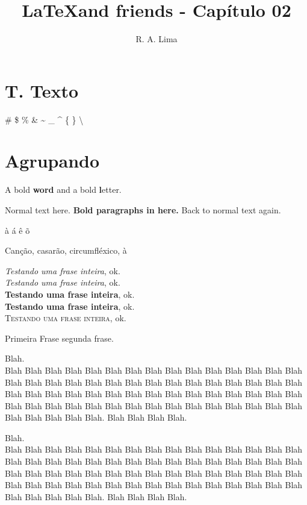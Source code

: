 \documentclass[a4paper, 12pt]{report}
\title{\LaTeX and friends - Capítulo 02}
\author{R. A. Lima}
\begin{document}
	\maketitle
	\section{T. Texto}
	\# \$ \% \& \textasciitilde
	\_ \textasciicircum 
	\{ \}
	\textbackslash

	\section{Agrupando}
	A bold \textbf{word} and a bold \textbf letter.

	Normal text here. {%
	\bfseries %
	Bold paragraphs in here.
	} %
	Back to  normal text again.

	\`{a} \'{a} \^{e} \~{o}

	Canção, casarão, circumfléxico, à 

	\begin{center}
		\emph{Testando uma frase inteira}, ok.\\
		\textit{Testando uma frase inteira}, ok.\\
		\textbf{Testando uma frase inteira}, ok.\\
		\textbf{Testando uma frase inteira}, ok.\\
		\textsc{Testando uma frase inteira}, ok.\\
	\end{center}

	Primeira Frase \hphantom{**********} segunda frase.
	\begin{flushleft}
		Blah. \\
		Blah Blah Blah Blah
		Blah Blah Blah Blah Blah Blah Blah Blah
		Blah Blah Blah Blah Blah Blah Blah Blah
		Blah Blah Blah Blah Blah Blah Blah Blah
		Blah Blah Blah Blah Blah Blah Blah Blah
		Blah Blah Blah Blah Blah Blah Blah Blah
		Blah Blah Blah Blah Blah Blah Blah Blah
		Blah Blah Blah Blah Blah Blah Blah Blah
		Blah Blah Blah Blah Blah.
		Blah Blah Blah Blah.
	\end{flushleft}
	\begin{flushright}
		Blah. \\
		Blah Blah Blah Blah
		Blah Blah Blah Blah Blah Blah Blah Blah
		Blah Blah Blah Blah Blah Blah Blah Blah
		Blah Blah Blah Blah Blah Blah Blah Blah
		Blah Blah Blah Blah Blah Blah Blah Blah
		Blah Blah Blah Blah Blah Blah Blah Blah
		Blah Blah Blah Blah Blah Blah Blah Blah
		Blah Blah Blah Blah Blah Blah Blah Blah
		Blah Blah Blah Blah Blah.
		Blah Blah Blah Blah.
	\end{flushright}
\end{document}
